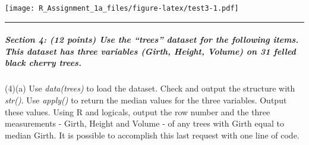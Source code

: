\documentclass[
]{article}
\newenvironment{Shaded}{\begin{snugshade}}{\end{snugshade}}
\newcommand{\AttributeTok}[1]{\textcolor[rgb]{0.77,0.63,0.00}{#1}}
\newcommand{\DecValTok}[1]{\textcolor[rgb]{0.00,0.00,0.81}{#1}}
\newcommand{\FunctionTok}[1]{\textcolor[rgb]{0.00,0.00,0.00}{#1}}
\newcommand{\NormalTok}[1]{#1}
\newcommand{\SpecialCharTok}[1]{\textcolor[rgb]{0.00,0.00,0.00}{#1}}
\newcommand{\StringTok}[1]{\textcolor[rgb]{0.31,0.60,0.02}{#1}}
\begin{document}
\begin{Shaded}
\end{Shaded}

\texttt{[image: R\_Assignment\_1a\_files/figure-latex/test3-1.pdf]}

\begin{center}\rule{0.5\linewidth}{0.5pt}\end{center}

\hypertarget{section-4-12-points-use-the-trees-dataset-for-the-following-items.-this-dataset-has-three-variables-girth-height-volume-on-31-felled-black-cherry-trees.}{%
\subparagraph{Section 4: (12 points) Use the ``trees'' dataset for the
following items. This dataset has three variables (Girth, Height,
Volume) on 31 felled black cherry
trees.}\label{section-4-12-points-use-the-trees-dataset-for-the-following-items.-this-dataset-has-three-variables-girth-height-volume-on-31-felled-black-cherry-trees.}}

(4)(a) Use \emph{data(trees)} to load the dataset. Check and output the
structure with \emph{str()}. Use \emph{apply()} to return the median
values for the three variables. Output these values. Using R and
logicals, output the row number and the three measurements - Girth,
Height and Volume - of any trees with Girth equal to median Girth. It is
possible to accomplish this last request with one line of code.
\end{document}
